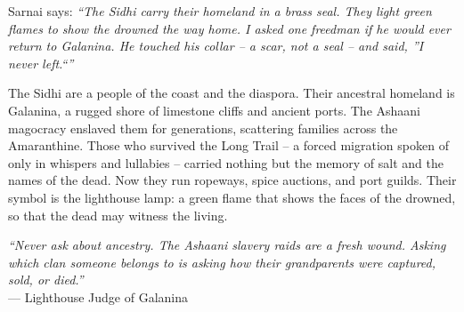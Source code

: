 \documentclass[12pt,oneside]{book}
\begin{document}
\noindent
Sarnai says: \textit{``The Sidhi carry their homeland in a brass seal. They light green flames to show the drowned the way home. I asked one freedman if he would ever return to Galanina. He touched his collar -- a scar, not a seal -- and said, ''I never left.``''}

\noindent
The Sidhi are a people of the coast and the diaspora. Their ancestral homeland is Galanina, a rugged shore of limestone cliffs and ancient ports. The Ashaani magocracy enslaved them for generations, scattering families across the Amaranthine. Those who survived the Long Trail -- a forced migration spoken of only in whispers and lullabies -- carried nothing but the memory of salt and the names of the dead. Now they run ropeways, spice auctions, and port guilds. Their symbol is the lighthouse lamp: a green flame that shows the faces of the drowned, so that the dead may witness the living.

\vspace{0.5em}
\noindent\textit{``Never ask about ancestry. The Ashaani slavery raids are a fresh wound. Asking which clan someone belongs to is asking how their grandparents were captured, sold, or died.''} \\
--- Lighthouse Judge of Galanina
\end{document}
